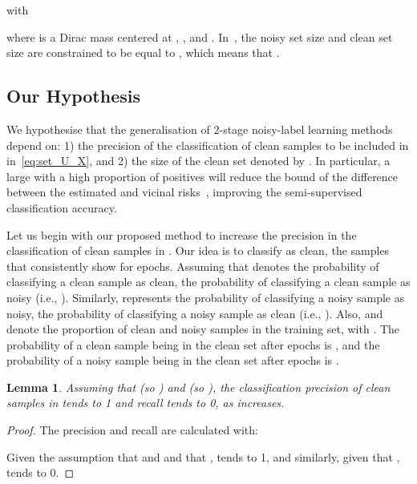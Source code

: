 \documentclass{article}
\newtheorem{lemma}[theorem]{Lemma}
\begin{document}
with

where  is a Dirac mass centered at , , and . In~\cite{li2020dividemix},  the noisy set size  and clean set size  are constrained to be equal to 
, which means that  .

\subsection{Our Hypothesis}
\label{sec:our_contribution}





We hypothesise that the generalisation of 2-stage noisy-label learning methods depend on: 1) the precision of the classification of clean samples to be included in  in~\eqref{eq:set_U_X}, and 2) the size of the clean set denoted by . 
In particular, a large  with a high proportion of positives will reduce the bound of the difference between the estimated and vicinal risks~\cite{zhang2018generalization}, improving the semi-supervised classification accuracy.  


Let us begin with our proposed method to increase the precision in the classification of clean samples in .  Our idea is to classify as clean, the samples that consistently show  for  epochs.  
Assuming that  denotes the probability of classifying a clean sample as clean,  the probability of classifying a clean sample as noisy (i.e., ). Similarly,  represents the probability of classifying a noisy sample as noisy,  the probability of classifying a noisy sample as clean (i.e., ). Also,  and  denote the proportion of clean and noisy samples in the training set, with .  The probability of a clean sample being in the clean set  after  epochs is , and 
the probability of a noisy sample being in the clean set after  epochs is .

\begin{lemma}
Assuming that  (so ) and  (so ), the classification precision of clean samples in  tends to 1 and recall tends to 0, as  increases.
\end{lemma}

\begin{proof}
The precision and recall are calculated with:

Given the assumption that  and  and that ,   tends to 1, and similarly, given that ,   tends to 0.
\end{proof}
\end{document}
